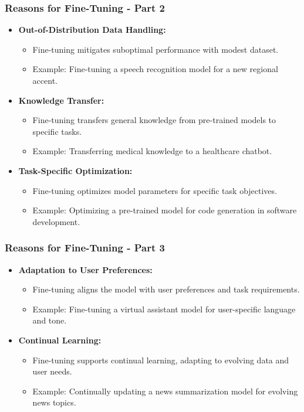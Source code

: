 \begin{frame}[fragile]\frametitle{Reasons for Fine-Tuning - Part 2}
  \begin{itemize}
    \item \textbf{Out-of-Distribution Data Handling:}
      \begin{itemize}
        \item Fine-tuning mitigates suboptimal performance with modest dataset.
        \item Example: Fine-tuning a speech recognition model for a new regional accent.
      \end{itemize}
    \item \textbf{Knowledge Transfer:}
      \begin{itemize}
        \item Fine-tuning transfers general knowledge from pre-trained models to specific tasks.
        \item Example: Transferring medical knowledge to a healthcare chatbot.
      \end{itemize}
    \item \textbf{Task-Specific Optimization:}
      \begin{itemize}
        \item Fine-tuning optimizes model parameters for specific task objectives.
        \item Example: Optimizing a pre-trained model for code generation in software development.
      \end{itemize}
  \end{itemize}
\end{frame}


\begin{frame}[fragile]\frametitle{Reasons for Fine-Tuning - Part 3}
  \begin{itemize}
    \item \textbf{Adaptation to User Preferences:}
      \begin{itemize}
        \item Fine-tuning aligns the model with user preferences and task requirements.
        \item Example: Fine-tuning a virtual assistant model for user-specific language and tone.
      \end{itemize}
    \item \textbf{Continual Learning:}
      \begin{itemize}
        \item Fine-tuning supports continual learning, adapting to evolving data and user needs.
        \item Example: Continually updating a news summarization model for evolving news topics.
      \end{itemize}
  \end{itemize}
\end{frame}

